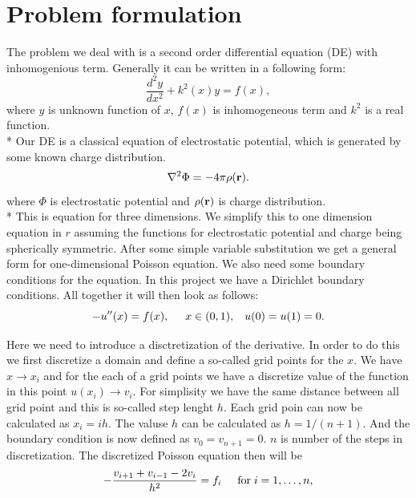 \documentclass[10pt]{article}
\begin{document}
\section{Problem formulation}
The problem we deal with is a second order differential equation (DE) with inhomogenious term. Generally it can be written in a following form:
\[
\frac{d^2y}{dx^2}+k^2(x)y = f(x),
\]
where $y$ is unknown function of $x$, $f(x)$ is inhomogeneous term and $k^2$ is a real function.\\* 
Our DE is a classical equation of electrostatic potential, which is generated by some known charge distribution. 
\[
\nabla^2 \Phi = -4\pi \rho ({\bf r}).
\]
where $\Phi$ is electrostatic potential and $\rho ({\bf r})$ is charge distribution. \\* 
This is equation for three dimensions. We simplify this to one dimension equation in $r$ assuming the functions for electrostatic potential and charge  being spherically symmetric. After some simple variable substitution we get a general form for one-dimensional Poisson equation. We also need some boundary conditions for the equation. In this project we have a Dirichlet boundary conditions. All together it will then look as follows:
\begin{equation}\label{equ:one}
-u''(x) = f(x), \hspace{0.5cm} x\in(0,1), \hspace{0.3cm} u(0) = u(1) = 0.
\end{equation}

Here we need to introduce a disctretization of the derivative. In order to do this we first discretize a domain and define a so-called grid points for the $ x $. We have $x\rightarrow x_{i}$ and for the each of a grid points we have a discretize value of the function in this point $u(x_{i})\rightarrow v_i$. For simplisity we have the same distance between all grid point and this is so-called step lenght $ h $. Each grid poin can now be calculated as $x_i=ih$. The valuse $ h $ can be calculated as $h=1/(n+1)$. And the boundary condition is now defined as $v_0 = v_{n+1} = 0$. $ n $ is number of the steps in discretization. The discretized Poisson equation then will be
\[
   -\frac{v_{i+1}+v_{i-1}-2v_i}{h^2} = f_i  \hspace{0.5cm} \mathrm{for} \hspace{0.1cm} i=1,\dots, n,
\]
\end{document}
